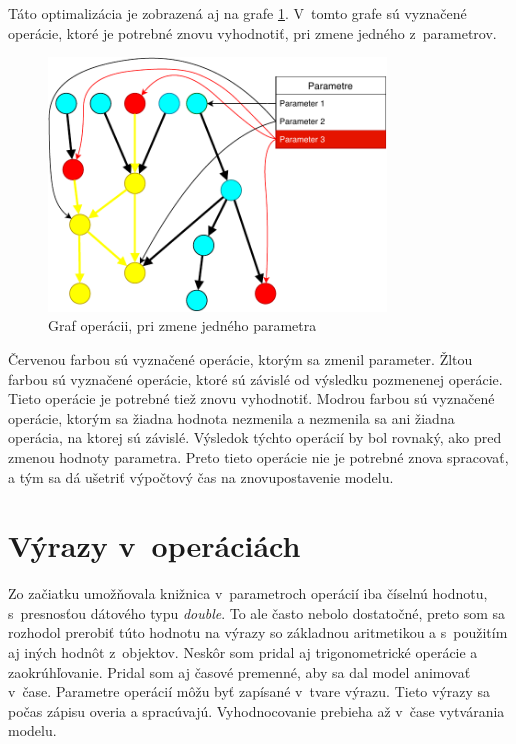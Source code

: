 Táto optimalizácia je zobrazená aj na grafe \ref{fig:build optimization}. V~tomto grafe sú vyznačené operácie, ktoré je potrebné znovu vyhodnotiť, pri zmene jedného z~parametrov. 

\begin{figure}[H]
	\centering
	\includegraphics[width=0.8\textwidth]{obrazky-figures/build optimalization.pdf}
	\caption{Graf operácii, pri zmene jedného parametra}
	\label{fig:build optimization}
\end{figure}
Červenou farbou sú vyznačené operácie, ktorým sa zmenil parameter. Žltou farbou sú vyznačené operácie, ktoré sú závislé od výsledku pozmenenej operácie. Tieto operácie je potrebné tiež znovu vyhodnotiť. Modrou farbou sú vyznačené operácie, ktorým sa žiadna hodnota nezmenila a nezmenila sa ani žiadna operácia, na ktorej sú závislé. Výsledok týchto operácií by bol rovnaký, ako pred zmenou hodnoty parametra. Preto tieto operácie nie je potrebné znova spracovať, a tým sa dá ušetriť výpočtový čas na znovupostavenie modelu.

\section{Výrazy v~operáciách}
\label{sec:vyrazy}
Zo začiatku umožňovala knižnica v~parametroch operácií iba číselnú hodnotu, s~presnosťou dátového typu \textit{double}. To ale často nebolo dostatočné, preto som sa rozhodol prerobiť túto hodnotu na výrazy so základnou aritmetikou a s~použitím aj iných hodnôt z~objektov. Neskôr som pridal aj trigonometrické operácie a zaokrúhľovanie. Pridal som aj  časové premenné, aby sa dal model animovať v~čase.
Parametre operácií môžu byť zapísané v~tvare výrazu. Tieto výrazy sa počas zápisu overia a spracúvajú. Vyhodnocovanie prebieha až v~čase vytvárania modelu.

